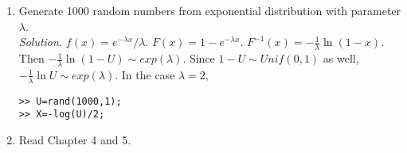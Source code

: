 \documentclass[12pt,twocolumn]{article} %
\begin{document}
\begin{enumerate}
\item Generate 1000 random numbers from exponential distribution
with parameter $\lambda$.\\
 {\em Solution.} $f(x)=e^{-\lambda
x}/\lambda$. $F(x) = 1 - e^{-\lambda x}$. $F^{-1}(x) =
-\frac{1}{\lambda}\ln(1 -x)$. Then $-\frac{1}{\lambda} \ln (1 - U)
\sim exp (\lambda)$. Since $ 1-U \sim Unif(0,1)$ as well,
$-\frac{1}{\lambda} \ln U \sim exp (\lambda)$. In the case
$\lambda =2$,
\begin{verbatim}
>> U=rand(1000,1);
>> X=-log(U)/2;
\end{verbatim}

\item Read Chapter 4 and 5.

\end{enumerate}
\end{document}
